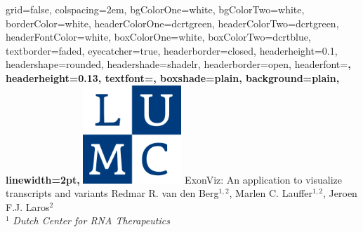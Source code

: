 \documentclass[portrait,a0paper,fontscale=0.31]{baposter}
\newcommand{\fcite}[2]{#1$^#2$}
\begin{document}


\begin{poster}%
  {
  grid=false,
  colspacing=2em,
  bgColorOne=white,
  bgColorTwo=white,
  borderColor=white,
  headerColorOne=dcrtgreen,
  headerColorTwo=dcrtgreen,
  headerFontColor=white,
  boxColorOne=white,
  boxColorTwo=dcrtblue,
  textborder=faded,
  eyecatcher=true,
  headerborder=closed,
  headerheight=0.1\textheight,
  headershape=rounded,
  headershade=shadelr,
  headerborder=open,
  headerfont=\Large\sf\bf, %
  headerheight=0.13\textheight,
  textfont={\setlength{\parindent}{1.5em}},
  boxshade=plain,
  background=plain,
  linewidth=2pt,
  }
  {\includegraphics[height=10em]{images/lumc-monogram-blauw-png.png}}
  {
    {
      ExonViz: An application to visualize transcripts and variants
    }
  }
  {
    {
      \fcite{Redmar R. van den Berg}{{1,2}}, \fcite{Marlen C. Lauffer}{{1,2}}, \fcite{Jeroen F.J. Laros}{{2}}
      \\{\smaller $^1$ \textit{Dutch Center for RNA Therapeutics}}
}}
\end{poster}
\end{document}
